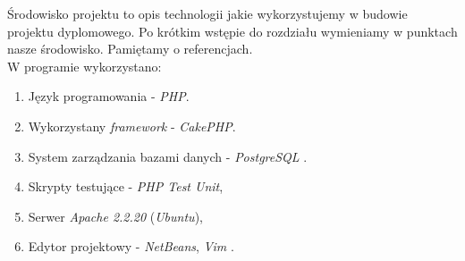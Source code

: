 Środowisko projektu to opis technologii jakie wykorzystujemy w budowie projektu dyplomowego. Po krótkim wstępie do rozdziału wymieniamy w punktach nasze środowisko. Pamiętamy o referencjach.\\

W programie wykorzystano:
\begin{enumerate}
 \item Język programowania - \emph{PHP}.
 \item Wykorzystany \emph{framework} - \emph{CakePHP}.
 \item System zarządzania bazami danych - \emph{PostgreSQL} \cite[s.\pageref{sec:referencje}]{postgresql}.
 \item Skrypty testujące - \emph{PHP Test Unit},
 \item Serwer \emph{Apache 2.2.20} (\emph{Ubuntu}),
 \item Edytor projektowy - \emph{NetBeans}, \emph{Vim} \cite[s.\pageref{sec:referencje}]{vim}.
\end{enumerate}